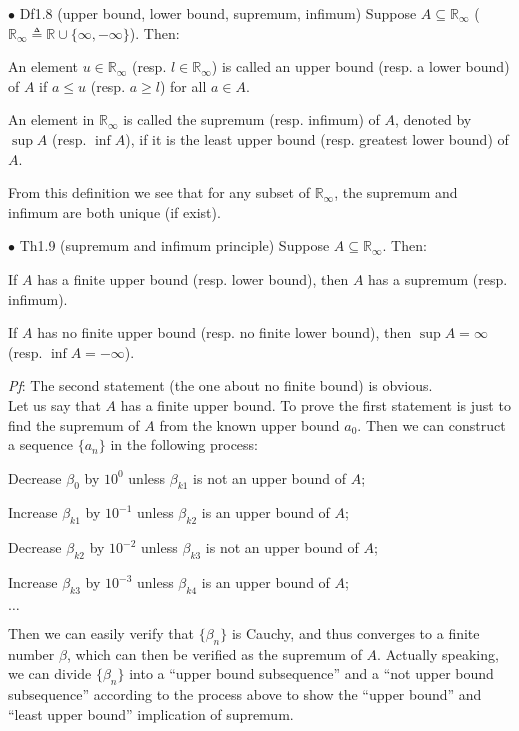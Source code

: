 \documentclass{article}
\begin{document}
\begin{Df}{$\bullet$ Df1.8 (upper bound, lower bound, supremum, infimum)}
    Suppose $A\subseteq\mathbb{R}_\infty$ (\textcolor{Df}{$\mathbb{R}_\infty\triangleq\mathbb{R}\cup\{\infty, -\infty\}$}). Then:
    \begin{compactenum}
        \item An element $u\in\mathbb{R}_\infty$ (resp. $l\in\mathbb{R}_\infty$) is called an upper bound (resp. a lower bound) of $A$ if $a\leq u$ (resp. $a\geq l$) for all $a\in A$.
        \item An element in $\mathbb{R}_\infty$ is called the supremum (resp. infimum) of $A$, denoted by $\sup A$ (resp. $\inf A$), if it is the least upper bound (resp. greatest lower bound) of $A$.
    \end{compactenum}
\end{Df}

\begin{Rmk}{}
    From this definition we see that \textcolor{Th}{for any subset of $\mathbb{R}_\infty$, the supremum and infimum are both unique (if exist).}
\end{Rmk}

\begin{Th}{$\bullet$ Th1.9 (supremum and infimum principle)}
    Suppose $A\subseteq\mathbb{R}_{\infty}$. Then:
    \begin{compactenum}
        \item If $A$ has a finite upper bound (resp. lower bound), then $A$ has a supremum (resp. infimum).
        \item If $A$ has no finite upper bound (resp. no finite lower bound), then $\sup A=\infty$ (resp. $\inf A=-\infty$).
    \end{compactenum}
    \tcblower
    \textit{Pf}: The second statement (the one about no finite bound) is obvious.\\
    Let us say that $A$ has a finite upper bound. To prove the first statement is just to find the supremum of $A$ from the known upper bound $a_0$. Then we can construct a sequence $\{a_n\}$ in the following process:
        \begin{compactenum}
            \item Decrease $\beta_0$ by $10^0$ unless $\beta_{k1}$ is not an upper bound of $A$;
            \item Increase $\beta_{k1}$ by $10^{-1}$ unless $\beta_{k2}$ is an upper bound of $A$;
            \item Decrease $\beta_{k2}$ by $10^{-2}$ unless $\beta_{k3}$ is not an upper bound of $A$;
            \item Increase $\beta_{k3}$ by $10^{-3}$ unless $\beta_{k4}$ is an upper bound of $A$;
            \item $\dots$
        \end{compactenum}
    Then we can easily verify that $\{\beta_n\}$ is Cauchy, and thus converges to a finite number $\beta$, which can then be verified as the supremum of $A$. Actually speaking, we can divide $\{\beta_n\}$ into a ``upper bound subsequence'' and a ``not upper bound subsequence'' according to the process above to show the ``upper bound'' and ``least upper bound'' implication of supremum.
\end{Th}
\end{document}
